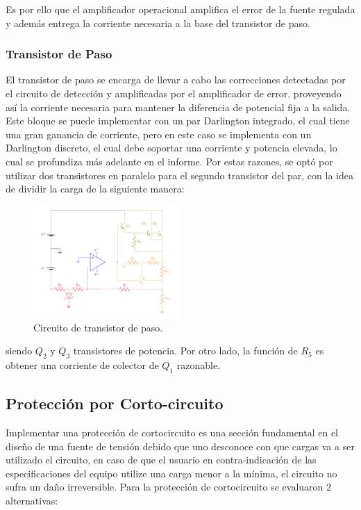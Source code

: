 Es por ello que el amplificador operacional amplifica el error de la fuente regulada y además entrega la corriente necesaria a la base del transistor de paso.

\subsubsection{Transistor de Paso}

\label{sec:transistor-de-paso}
El transistor de paso se encarga de llevar a cabo las correcciones detectadas por el circuito de detección y amplificadas por el amplificador de error, proveyendo así la corriente necesaria para mantener la diferencia de potencial fija a la salida. Este bloque se puede implementar con un par Darlington integrado, el cual tiene una gran ganancia de corriente, pero en este caso se implementa con un Darlington discreto, el cual debe soportar una corriente y potencia elevada, lo cual se profundiza más adelante en el informe. Por estas razones, se optó por utilizar dos transistores en paralelo para el segundo transistor del par, con la idea de dividir la carga de la siguiente manera:
\begin{figure}[H]
\centering
	\includegraphics[width=0.5\textwidth, page=5]{ImagenesEjercicio2/Regulador.pdf}
	\caption{Circuito de transistor de paso.}
	\label{fig:transistorDePaso}
\end{figure}
siendo $Q_2$ y $Q_3$ transistores de potencia. Por otro lado, la función de $R_5$ es obtener una corriente de colector de $Q_1$ razonable.

\subsection{Protección por Corto-circuito}
Implementar una protección de cortocircuito es una sección fundamental en el diseño de una fuente de tensión debido que uno desconoce con que cargas va  a ser utilizado el circuito, en caso de que el usuario en contra-indicación de las especificaciones del equipo utilize una carga menor a la mínima, el circuito no sufra un daño irreversible. 
Para la protección de cortocircuito se evaluaron 2 alternativas:
